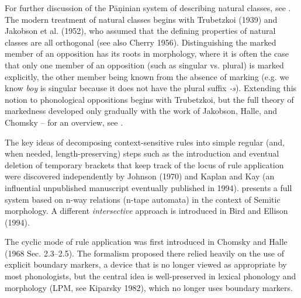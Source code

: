 For further discussion of the P\={a}\d{n}inian system of describing natural
classes, see . The modern treatment of natural classes
begins with Trubetzkoi (1939)\nocite{Trubetskoi:1939} and Jakobson et
al. (1952), \nocite{Jakobson:1952} who assumed that the defining properties of
natural classes are all orthogonal (see also Cherry 1956).
\nocite{Cherry:1956} Distinguishing the marked member of an opposition has its
roots in morphology, where it is often the case that only one member of an
opposition (such as singular vs. plural) is marked explicitly, the other
member being known from the absence of marking (e.g. we know {\it boy} is
singular because it does not have the plural suffix {\it -s}). Extending this
notion to phonological oppositions begins with Trubetzkoi, but the full theory
of markedness developed only gradually with the work of Jakobson, Halle, and
Chomsky -- for an overview, see .

The key ideas of decomposing context-sensitive rules into simple regular (and,
when needed, length-preserving) steps such as the introduction and eventual
deletion of temporary brackets that keep track of the locus of rule
application were discovered independently by Johnson (1970) and Kaplan and Kay
(an influential unpublished manuscript eventually published in 1994).
\nocite{Kaplan:1994}  presents a full system based on n-way
relations (n-tape automata) in the context of Semitic morphology.  A different
{\it intersective} approach is introduced in Bird and Ellison (1994).
\nocite{Bird:1994} 

The cyclic mode of rule application was first introduced in Chomsky and Halle
(1968 Sec. 2.3--2.5). The formalism proposed there relied heavily on the use of
explicit boundary markers, a device that is no longer viewed as appropriate by
most phonologists, but the central idea is well-preserved in lexical phonology
and morphology (LPM, see Kiparsky 1982),
 which no longer uses boundary markers.
\nocite{Chomsky:1968} \nocite{Kiparsky:1982}

\endinput


phonics mapping

duke of York

\footnote{While the main line of development is clear, the actual
history of such results is often more complex. For a discussion of the
long-range effects of the Peters-Ritchie results see Newmeyer (1980), for
those of Johnson's results, Karttunen (1993).} \nocite{Newmeyer:1980}

\vbox{
\synttree[{\small SUPRALARYNGEAL}
[{\small nasal}]
[{\small cont}]
[{\small lateral}]
[{\small PLACE}
[{\small  LABIAL} [{\small distr}] [{\small round}] ]
[{\small  CORONAL} [{\small distr}] [{\small anterior}]]
[{\small  DORSAL} [{\small back}] [{\small high}] [{\small low}]]
[{\small RAD}]
]
[{\small approx}]
]
}
